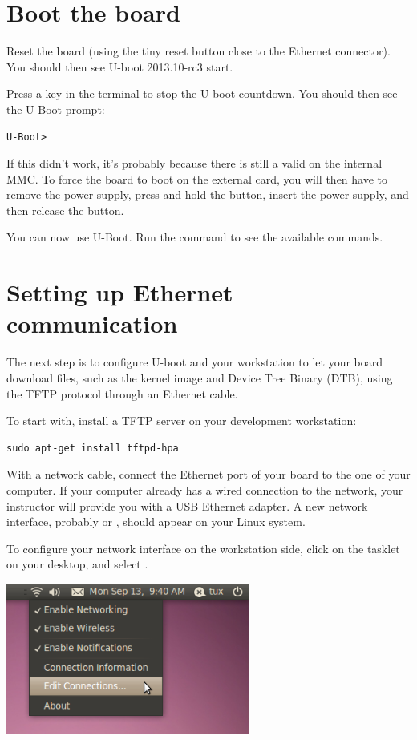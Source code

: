 \section{Boot the board}

Reset the board (using the tiny reset button close to the Ethernet
connector). You should then see U-boot 2013.10-rc3 start.

Press a key in the  terminal to stop the U-boot
countdown. You should then see the U-Boot prompt:
\begin{verbatim}
U-Boot>
\end{verbatim}

If this didn't work, it's probably because there is still a valid
 on the internal MMC. To force the board to boot on the
external card, you will then have to remove the power supply, press and
hold the  button, insert the power supply, and then
release the  button.

You can now use U-Boot. Run the  command to see the available
commands.

\section{Setting up Ethernet communication}

The next step is to configure U-boot and your workstation to let your
board download files, such as the kernel image and Device Tree Binary
(DTB), using the TFTP protocol through an Ethernet cable.

To start with, install a TFTP server on your development workstation:

\begin{verbatim}
sudo apt-get install tftpd-hpa
\end{verbatim}

With a network cable, connect the Ethernet port of your board to the
one of your computer. If your computer already has a wired connection
to the network, your instructor will provide you with a USB Ethernet
adapter. A new network interface, probably  or ,
should appear on your Linux system.

To configure your network interface on the workstation side, click on
the  tasklet on your desktop, and select
.

\begin{center}
\includegraphics[width=8cm]{labs/kernel-board-setup/network-config-1.png}
\end{center}

